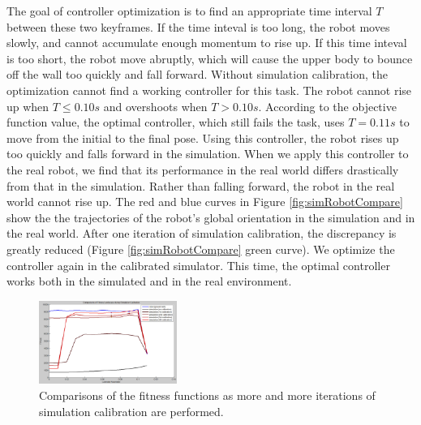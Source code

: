 The goal of controller optimization is to find an appropriate time interval $T$ between these two keyframes. If the time inteval is too long, the robot moves slowly, and cannot accumulate enough momentum to rise up. If this time inteval is too short, the robot move abruptly, which will cause the upper body to bounce off the wall too quickly and fall forward. Without simulation calibration, the optimization cannot find a working controller for this task. The robot cannot rise up when $T\leq 0.10s$ and overshoots when $T > 0.10s$. According to the objective function value, the optimal controller, which still fails the task, uses $T=0.11s$ to move from the initial to the final pose. Using this controller, the robot rises up too quickly and falls forward in the simulation. When we apply this controller to the real robot, we find that its performance in the real world differs drastically from that in the simulation. Rather than falling forward, the robot in the real world cannot rise up. The red and blue curves in Figure \ref{fig:simRobotCompare} show the the trajectories of the robot's global orientation in the simulation and in the real world. After one iteration of simulation calibration, the discrepancy is greatly reduced (Figure \ref{fig:simRobotCompare} green curve). We optimize the controller again in the calibrated simulator. This time, the optimal controller works both in the simulated and in the real environment.

\begin{figure}[!t]
  \centering
  \includegraphics[width=0.4\textwidth]{figures/fitnessLandscape}
  \caption{Comparisons of the fitness functions as more and more iterations of simulation calibration are performed.}
  \label{fig:fitnessLandscape}
\end{figure}

